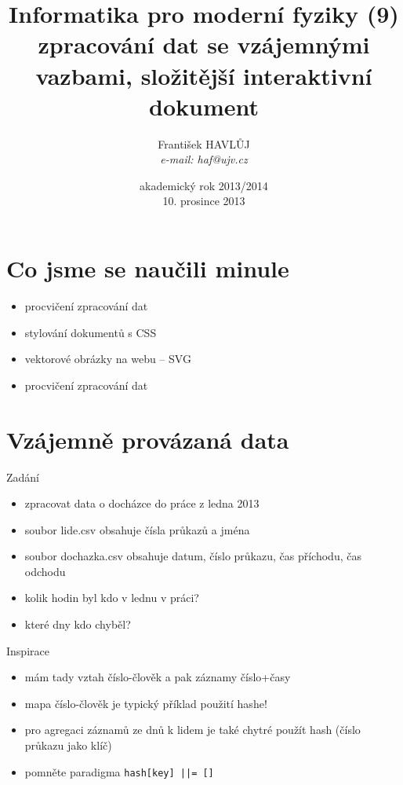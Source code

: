 \documentclass{beamer}
\title[IMF (9)]{Informatika pro moderní fyziky (9)\\ zpracování dat se vzájemnými vazbami, složitější interaktivní dokument}
\author[Franti\v{s}ek HAVL\r{U}J, ORF ÚJV Řež]{Franti\v{s}ek HAVL\r{U}J\\{\scriptsize \emph{e-mail: haf@ujv.cz}}}
\date{akademický rok 2013/2014\\10. prosince 2013}
\institute[ORF ÚJV Řež]
{ÚJV Řež\\oddělení Reaktorové fyziky a podpory palivového cyklu}
\begin{document}
\begin{frame}
  \titlepage
\end{frame}

\begin{frame}
  \tableofcontents
\end{frame}

\section{Co jsme se naučili minule}

\begin{frame}{}
  \begin{itemize}
    \item procvičení zpracování dat
    \item stylování dokumentů s CSS
    \item vektorové obrázky na webu -- SVG
    \item procvičení zpracování dat
  \end{itemize}
\end{frame}

\section{Vzájemně provázaná data}

\begin{frame}{Zadání}
  \begin{itemize}
    \item zpracovat data o docházce do práce z ledna 2013
    \item soubor lide.csv obsahuje čísla průkazů a jména
    \item soubor dochazka.csv obsahuje datum, číslo průkazu, čas příchodu, čas odchodu
    \item kolik hodin byl kdo v lednu v práci?
    \item které dny kdo chyběl?
  \end{itemize}
\end{frame}

\begin{frame}{Inspirace}
  \begin{itemize}
    \item mám tady vztah číslo-člověk a pak záznamy číslo+časy
    \item mapa číslo-člověk je typický příklad použití hashe!
    \item pro agregaci záznamů ze dnů k lidem je také chytré použít hash (číslo průkazu jako klíč)
    \item pomněte paradigma \texttt{hash[key] ||= []}
  \end{itemize}
\end{frame}
\end{document}
